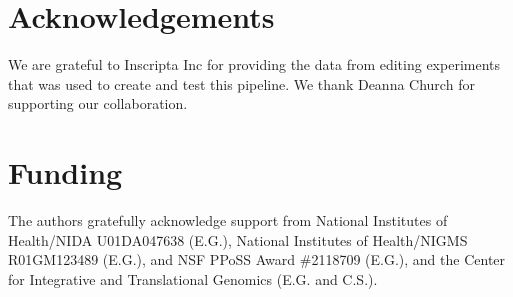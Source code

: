 \documentclass{bioinfo}
\theoremstyle{definition}
\begin{document}

\section*{Acknowledgements}
We are grateful to Inscripta Inc for providing the data from editing experiments that was used to create and test this pipeline. We thank Deanna Church for supporting our collaboration.

\section*{Funding}
The authors gratefully acknowledge support from National Institutes of Health/NIDA U01DA047638 (E.G.), National Institutes of Health/NIGMS R01GM123489 (E.G.), and NSF PPoSS Award \#2118709 (E.G.), and the Center for Integrative and Translational Genomics (E.G. and C.S.).
\end{document}
